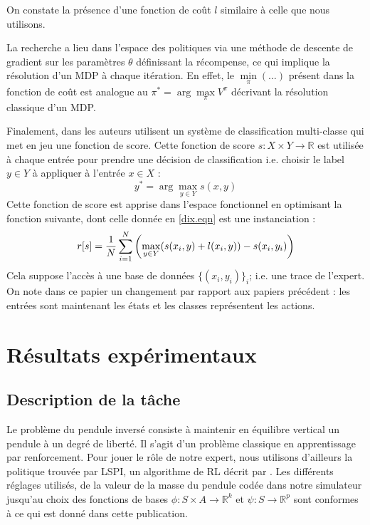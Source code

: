 \documentclass[publibook-draft]{CAp2012}
\begin{document}
{   On constate la présence d'une fonction de coût $l$ similaire à celle que nous utilisons.

   La recherche a lieu dans l'espace des politiques via une méthode de descente de gradient sur les paramètres $\theta$ définissant la récompense, ce qui implique la résolution d'un MDP à chaque itération. En effet, le $\min\limits_\pi(\dots)$ présent dans la fonction de coût est analogue au $\pi^* = \arg\max\limits_\pi V^\pi$ décrivant la résolution classique d'un MDP.

   Finalement, dans \citep{ratliff2007imitation} les auteurs utilisent un système de classification multi-classe qui met en jeu une fonction de score. Cette fonction de score $s : X\times Y \rightarrow \mathbb{R}$ est utilisée à chaque entrée pour prendre une décision de classification i.e. choisir le label $y\in Y$ à appliquer à l'entrée $x\in X$ :
   \begin{equation}
   \label{sdef.eqn}
   y^* = \arg\max_{y \in Y} s(x,y)
   \end{equation}
   Cette fonction de score est apprise dans l'espace fonctionnel en optimisant la fonction suivante, dont celle donnée en \ref{dix.eqn} est une instanciation :
   \begin{equation}
   \label{rdef.eqn}
   r[s] = {1\over N} \sum_{i=1}^N\left(\max_{y\in Y}(s(x_i,y) + l(x_i,y)) - s(x_i,y_i) \right)
   \end{equation}
   Cela suppose l'accès à une base de données $\{(x_i,y_i)\}_i$; i.e. une trace de l'expert. On note dans ce papier un changement par rapport aux papiers précédent : les entrées sont maintenant les états et les classes représentent les actions.

\section{Résultats expérimentaux}
\label{exp.sec}
\subsection{Description de la tâche}
Le problème du pendule inversé consiste à maintenir en équilibre vertical un pendule à un degré de liberté. Il s'agit d'un problème classique en apprentissage par renforcement. Pour jouer le rôle de notre expert, nous utilisons d'ailleurs la politique trouvée par LSPI, un algorithme de RL décrit par \citet{lagoudakis2003least}. Les différents réglages utilisés, de la valeur de la masse du pendule codée dans notre simulateur jusqu'au choix des fonctions de bases $\phi : S\times A \rightarrow \mathbb{R}^k$ et $\psi : S \rightarrow \mathbb{R}^p$ sont conformes à ce qui est donné dans cette publication.\\

}
\end{document}
